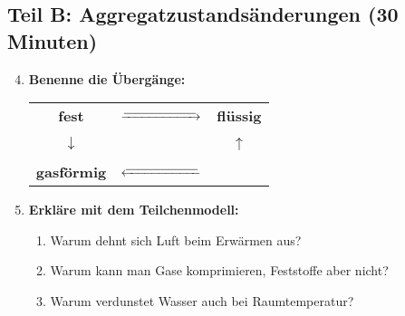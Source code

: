 \subsection*{Teil B: Aggregatzustandsänderungen (30 Minuten)}

\begin{enumerate}[label=\arabic*.]
    \setcounter{enumi}{3}

    \item \textbf{Benenne die Übergänge:}
    \vspace{0.5cm}

    \begin{center}
        \begin{tabular}{ccc}
            \textbf{fest} & $\xrightarrow{\text{\underline{\hspace{2cm}}}}$ & \textbf{flüssig} \\[1cm]
            & & \\
            $\downarrow$ \underline{\hspace{2cm}} & & $\uparrow$ \underline{\hspace{2cm}} \\[1cm]
            & & \\
            \textbf{gasförmig} & $\xleftarrow{\text{\underline{\hspace{2cm}}}}$ & 
        \end{tabular}
    \end{center}

    \vspace{1cm}

    \item \textbf{Erkläre mit dem Teilchenmodell:}
    \vspace{0.5cm}

    \begin{enumerate}[label=\alph*)]
        \item Warum dehnt sich Luft beim Erwärmen aus?
        \vspace{2cm}

        \item Warum kann man Gase komprimieren, Feststoffe aber nicht?
        \vspace{2cm}

        \item Warum verdunstet Wasser auch bei Raumtemperatur?
        \vspace{2cm}
    \end{enumerate}

    \vspace{1cm}


\end{enumerate}
